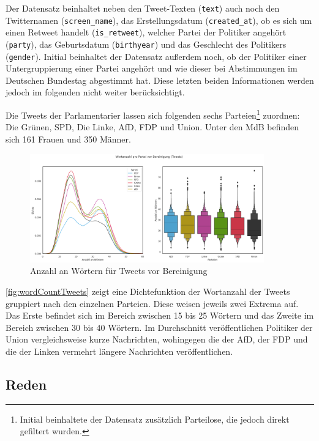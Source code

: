 Der Datensatz beinhaltet neben den Tweet-Texten (\texttt{text}) auch noch den Twitternamen (\texttt{screen\_name}), das Erstellungsdatum (\texttt{created\_at}), ob es sich um einen Retweet handelt (\texttt{is\_retweet}), welcher Partei der Politiker angehört (\texttt{party}), das Geburtsdatum (\texttt{birthyear}) und das Geschlecht des Politikers (\texttt{gender}). Initial beinhaltet der Datensatz außerdem noch, ob der Politiker einer Untergruppierung einer Partei angehört und wie dieser bei Abstimmungen im Deutschen Bundestag abgestimmt hat. Diese letzten beiden Informationen werden jedoch im folgenden nicht weiter berücksichtigt.

Die Tweets der Parlamentarier lassen sich folgenden sechs Parteien\footnote{Initial beinhaltete der Datensatz zusätzlich Parteilose, die jedoch direkt gefiltert wurden.} zuordnen: Die Grünen, \ac{SPD}, Die Linke, \ac{AfD}, \ac{FDP} und Union. Unter den \ac{MdB} befinden sich \num{161} Frauen und \num{350} Männer.

\begin{figure}[H]
    \centering
    \includegraphics[width=0.9\textwidth]{data/images/tweets/wortanzahl_pro_partei_vor_bereinigung.png}
    \caption{Anzahl an Wörtern für Tweets vor Bereinigung} \label{fig:wordCountTweets}
\end{figure}

\autoref{fig:wordCountTweets} zeigt eine Dichtefunktion der Wortanzahl der Tweets gruppiert nach den einzelnen Parteien. Diese weisen jeweils zwei Extrema auf. Das Erste befindet sich im Bereich zwischen \num{15} bis \num{25} Wörtern und das Zweite im Bereich zwischen \num{30} bis \num{40} Wörtern. Im Durchschnitt veröffentlichen Politiker der Union vergleichsweise kurze Nachrichten, wohingegen die der \ac{AfD}, der \ac{FDP} und die der Linken vermehrt längere Nachrichten veröffentlichen.

\subsection*{Reden} \label{subsec:dataUnderstandingReden}

